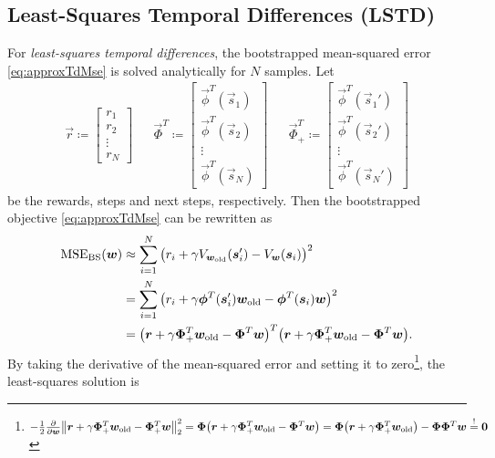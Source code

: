 		\subsection{Least-Squares Temporal Differences (LSTD)}
			For \emph{least-squares temporal differences}, the bootstrapped mean-squared error \eqref{eq:approxTdMse} is solved analytically for \(N\) samples. Let
			\begin{align*}
				\vec{r} \coloneqq
					\begin{bmatrix}
						r_1 \\
						r_2 \\
						\vdots \\
						r_N
					\end{bmatrix}
				&&
				\vec{\Phi}^T \coloneqq
					\begin{bmatrix}
						\vec{\phi}^T(\vec{s}_1) \\
						\vec{\phi}^T(\vec{s}_2) \\
						\vdots \\
						\vec{\phi}^T(\vec{s}_N)
					\end{bmatrix}
				&&
				\vec{\Phi}_+^T \coloneqq
					\begin{bmatrix}
						\vec{\phi}^T(\vec{s}_1') \\
						\vec{\phi}^T(\vec{s}_2') \\
						\vdots \\
						\vec{\phi}^T(\vec{s}_N')
					\end{bmatrix}
			\end{align*}
			be the rewards, steps and next steps, respectively. Then the bootstrapped objective \eqref{eq:approxTdMse} can be rewritten as
			\begin{align*}
				\operatorname{MSE}_\mathrm{BS}(\bm{w})
					&\approx \sum_{i = 1}^{N} \big( r_i + \gamma V_{\bm{w}_\mathrm{old}}(\bm{s}_i') - V_{\bm{w}}(\bm{s}_i) \big)^2 \\
					&= \sum_{i = 1}^{N} \big( r_i + \gamma \bm{\phi}^T(\bm{s}_i') \bm{w}_\mathrm{old} - \bm{\phi}^T(\bm{s}_i) \bm{w} \big)^2 \\
					&= \big( \bm{r} + \gamma \bm{\Phi}_+^T \bm{w}_\mathrm{old} - \bm{\Phi}^T \bm{w} \big)^T \big( \bm{r} + \gamma \bm{\Phi}_+^T \bm{w}_\mathrm{old} - \bm{\Phi}^T \bm{w} \big).
			\end{align*}
			By taking the derivative of the mean-squared error and setting it to zero\footnote{\( -\frac{1}{2} \pdv{\bm{w}} \big\lVert \bm{r} + \gamma \bm{\Phi}_+^T \bm{w}_\mathrm{old} - \bm{\Phi}_+^T \bm{w} \big\rVert_2^2 = \bm{\Phi} \big( \bm{r} + \gamma \bm{\Phi}_+^T \bm{w}_\mathrm{old} - \bm{\Phi}^T \bm{w} \big) = \bm{\Phi} \big( \bm{r} + \gamma \bm{\Phi}_+^T \bm{w}_\mathrm{old} \big) - \bm{\Phi} \bm{\Phi}^T \bm{w} \overset{!}{=} \bm{0} \)}, the least-squares solution is

